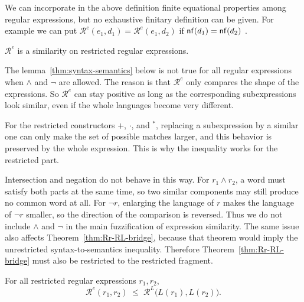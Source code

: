 {\color{red} \begin{remark} We can incorporate in the above definition finite equational properties among regular expressions, but no exhaustive finitary definition can be given. For example we can put $\mathcal R^e(e_1,d_1) = \mathcal R^e(e_1,d_2)$ if ${\sf nf}(d_1)={\sf nf}(d_2)$ .
\end{remark}
}

\begin{lemma} $\mathcal R^e$ is a similarity on restricted regular expressions.
\end{lemma}

\begin{remark}\label{rem:syntax-semantics-exceptions}
The lemma~\ref{thm:syntax-semantics} below is not true for all regular expressions when $\wedge$ and $\neg$ are allowed.
The reason is that $\mathcal{R}^e$ only compares the shape of the expressions.
So $\mathcal{R}^e$ can stay positive as long as the corresponding subexpressions look similar, even if the whole languages become very different.

For the restricted constructors $+$, $\cdot$, and ${}^\ast$, replacing a
subexpression by a similar one can only make the set of possible matches larger,
and this behavior is preserved by the whole expression. This is why the
inequality works for the restricted part.

Intersection and negation do not behave in this way. For $r_1 \wedge r_2$, a
word must satisfy both parts at the same time, so two similar components may
still produce no common word at all. For $\neg r$, enlarging the language of
$r$ makes the language of $\neg r$ smaller, so the direction of the comparison
is reversed. Thus we do not include $\wedge$ and $\neg$ in the main
fuzzification of expression similarity.
The same issue also affects Theorem~\ref{thm:Rr-RL-bridge}, because that theorem would imply the unrestricted syntax-to-semantics inequality.
Therefore Theorem~\ref{thm:Rr-RL-bridge} must also be restricted to the restricted fragment.
\end{remark}

\begin{lemma}\label{thm:syntax-semantics}
For all restricted regular expressions $r_1,r_2$,
\[
\mathcal{R}^e(r_1,r_2)\; \leq \;\mathcal{R}^L\bigl(L(r_1),L(r_2)\bigr).
\]
\end{lemma}



